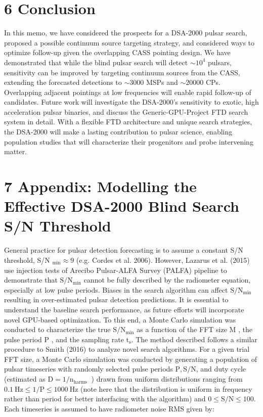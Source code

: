\documentclass[10pt]{article}
\begin{document}
\section*{6 Conclusion}
In this memo, we have considered the prospects for a DSA-2000 pulsar search, proposed a possible continuum source targeting strategy, and considered ways to optimize follow-up given the overlapping CASS pointing design. We have demonstrated that while the blind pulsar search will detect \(\sim 10^{4}\) pulsars, sensitivity can be improved by targeting continuum sources from the CASS, extending the forecasted detections to \(\sim 3000\) MSPs and \(\sim 20000\) CPs. Overlapping adjacent pointings at low frequencies will enable rapid follow-up of candidates. Future work will investigate the DSA-2000's sensitivity to exotic, high acceleration pulsar binaries, and discuss the Generic-GPU-Project FTD search system in detail. With a flexible FTD architecture and unique search strategies, the DSA-2000 will make a lasting contribution to pulsar science, enabling population studies that will characterize their progenitors and probe intervening matter.

\section*{7 Appendix: Modelling the Effective DSA-2000 Blind Search S/N Threshold}
General practice for pulsar detection forecasting is to assume a constant S/N threshold, S/N \({ }_{\min } \approx 9\) (e.g. Cordes et al. 2006). However, Lazarus et al. (2015) use injection tests of Arecibo Pulsar-ALFA Survey (PALFA) pipeline to demonstrate that \(\mathrm{S} / \mathrm{N}_{\min }\) cannot be fully described by the radiometer equation, especially at low pulse periods. Biases in the search algorithm can affect \(\mathrm{S} / \mathrm{N}_{\text {min }}\) resulting in over-estimated pulsar detection predictions. It is essential to understand the baseline search performance, as future efforts will incorporate novel GPU-based optimization. To this end, a Monte Carlo simulation was conducted to characterize the true \(\mathrm{S} / \mathrm{N}_{\min }\) as a function of the FFT size M , the pulse period P , and the sampling rate \(\mathrm{t}_{\mathrm{s}}\). The method described follows a similar procedure to Smith (2016) to analyze novel search algorithms. For a given trial FFT size, a Monte Carlo simulation was conducted by generating a population of pulsar timeseries with randomly selected pulse periods \(\mathrm{P}, \mathrm{S} / \mathrm{N}\), and duty cycle (estimated as \(\mathrm{D}=1 / \mathrm{n}_{\text {harms }}\) ) drawn from uniform distributions ranging from \(0.1 \mathrm{~Hz} \leq 1 / \mathrm{P} \leq 1000 \mathrm{~Hz}\) (note here that the distribution is uniform in frequency rather than period for better interfacing with the algorithm) and \(0 \leq \mathrm{S} / \mathrm{N} \leq 100\). Each timeseries is assumed to have radiometer noise RMS given by:
\end{document}
